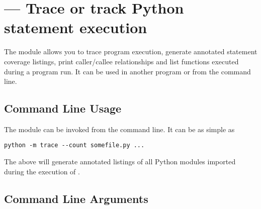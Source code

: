 \section{ ---
         Trace or track Python statement execution}


The  module allows you to trace program execution, generate
annotated statement coverage listings, print caller/callee relationships and
list functions executed during a program run.  It can be used in another
program or from the command line.

\subsection{Command Line Usage}

The  module can be invoked from the command line.  It can be
as simple as

\begin{verbatim}
python -m trace --count somefile.py ...
\end{verbatim}

The above will generate annotated listings of all Python modules imported
during the execution of .

\subsection{Command Line Arguments}


